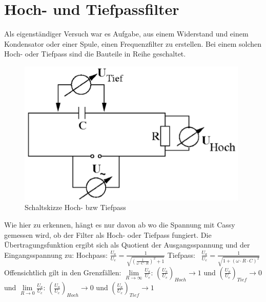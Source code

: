 \documentclass[a4paper, 11pt]{article}
\begin{document}
\section{Hoch- und Tiefpassfilter}
Als eigenständiger Versuch war es Aufgabe, aus einem Widerstand und einem Kondensator oder einer Spule, einen Frequenzfilter zu erstellen. Bei einem solchen Hoch- oder Tiefpass sind die Bauteile in Reihe geschaltet.
\newline
\begin{figure}[H]
	\hskip -0.5cm
	\includegraphics[trim = 0mm 0mm 0mm 0mm,clip, width=11cm]{Bilder/Schaltskizze_Filter.png}%
	\caption[Schaltskizze Hoch- bzw Tiefpass]{Schaltskizze Hoch- bzw Tiefpass}%
	\label{pic:Abbildung 1}%
\end{figure}
Wie hier zu erkennen, hängt es nur davon ab wo die Spannung mit Cassy gemessen wird, ob der Filter als Hoch- oder Tiefpass fungiert. Die Übertragungsfunktion ergibt sich als Quotient der Ausgangsspannung und der Eingangsspannung zu:
\newline
\newline
Hochpass: $\frac{U_a}{U_e}=\frac{1}{\sqrt{(\frac{1}{\omega \cdot C \cdot R})^2+1}}$ 
\newline
Tiefpass: \, $\frac{U_a}{U_e}=\frac{1}{\sqrt{1+(\omega \cdot R \cdot C)^2}}$
\newline
\newline
Offensichtlich gilt in den Grenzfällen: 
\newline
\newline
$\lim\limits_{R \rightarrow \infty}{\frac{U_a}{U_e}}$:\;\;\; $(\frac{U_a}{U_e})_{Hoch} \rightarrow  1$ und $(\frac{U_a}{U_e})_{Tief} \rightarrow 0$
\newline und
\newline
 $\lim\limits_{R  \to 0}{\frac{U_a}{U_e}}$:  \;\;\; $(\frac{U_a}{U_e})_{Hoch} \rightarrow  0$ und $(\frac{U_a}{U_e})_{Tief} \rightarrow 1$
\end{document}
